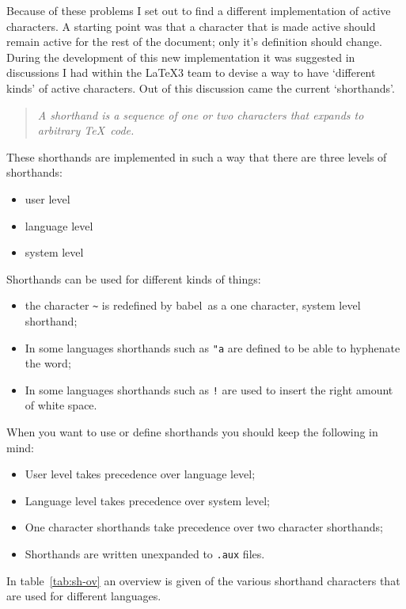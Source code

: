 \documentclass{ltugboat}
\newcommand*{\file}[1]{\texttt{#1}}
\newcommand*\babel{\textsf{babel}}
\begin{document}
Because of these problems I set out to find a different implementation
of active characters. A starting point was that a character that is
made active should remain active for the rest of the document; only
it's definition should change. During the development of this new
implementation it was suggested in discussions I had within the
\LaTeX3 team to devise a way to have `different kinds' of active
characters. Out of this discussion came the current `shorthands'.

\begin{quote}
  \textsl{A shorthand is a sequence of one or two characters that
    expands to arbitrary \TeX\ code.}
\end{quote}

These shorthands are implemented in such a way that there are three
levels of shorthands:

\begin{itemize}
\item user level
\item language level
\item system level
\end{itemize}

\noindent Shorthands can be used for different kinds of things:
\begin{itemize}
\item the character \verb=~= is redefined by \babel\ as a one
  character, system level shorthand;
\item In some languages shorthands such as \verb="a= are defined to be
  able to hyphenate the word;
\item In some languages shorthands such as \verb=!= are used to insert
  the right amount of white space.
\end{itemize}

When you want to use or define shorthands you should keep the
following in mind:
\begin{itemize}
\item User level takes precedence over language level;
\item Language level takes precedence over system level;
\item One character shorthands take precedence over two character
  shorthands;
\item Shorthands are written unexpanded to \file{.aux} files.
\end{itemize}

\noindent In table~\ref{tab:sh-ov} an overview is given of the
various shorthand characters that are used for different languages.
\end{document}

